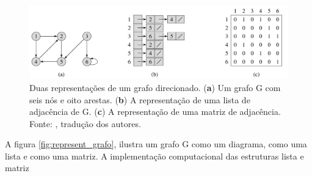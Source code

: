 \begin{figure}[!htb]
\centering
\includegraphics[width=16cm]{represent_grafo_ND.png}
\caption{Duas representações de um grafo direcionado. (\textbf{a}) Um grafo G com seis nós e oito arestas. (\textbf{b}) A representação de uma lista de adjacência de G. (\textbf{c}) A representação de uma matriz de adjacência. Fonte: \cite{Cormen2009}, tradução dos autores.}
\label{fig:represent_grafo_ND}
\end{figure}

A figura \ref{fig:represent_grafo}, ilustra um grafo G como um diagrama, como uma lista e como uma matriz. A implementação computacional das estruturas lista e matriz




